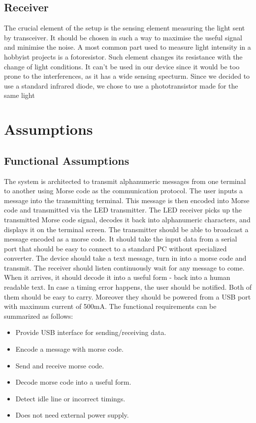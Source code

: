 \documentclass[12pt]{article}
\begin{document}
  \newpage
  \subsection{Receiver}
  The crucial element of the setup is the sensing element measuring the light sent by transceiver.
  It should be chosen in such a way to maximise the useful signal and minimise the noise.
  A most common part used to measure light intensity in a hobbyist projects is a fotoresistor. Such element changes its resistance with the change of light conditions. 
  It can't be used in our device since it would be too prone to the interferences, as it has a wide sensing specturm.
  Since we decided to use a standard infrared diode, we chose to use a phototransistor made for the same light 
	
	\section{Assumptions}
	\subsection{Functional Assumptions}
  The system is architected to transmit alphanumeric messages from one terminal to another using Morse code as the communication protocol. The user inputs a message into the transmitting terminal. This message is then encoded into Morse code and 
  transmitted via the LED transmitter. The LED receiver picks up the transmitted Morse code signal, decodes it back into alphanumeric characters, and displays it on the terminal screen.
  The transmitter should be able to broadcast a message encoded as a morse code. It should take the input data from a serial port that should be easy to connect to a standard PC without specialized converter.
  The device should take a text message, turn in into a morse code and transmit.
  The receiver should listen continuously wait for any message to come. When it arrives, it should decode it into a useful form - back into a human readable text. In case a timing error happens, the user should be notified.
  Both of them should be easy to carry. Moreover they should be powered from a USB port with maximum current of 500mA.
  The functional requirements can be summarized as follows:
  \begin{itemize}
    \item Provide USB interface for sending/receiving data.
    \item Encode a message with morse code.
    \item Send and receive morse code.
    \item Decode morse code into a useful form.
    \item Detect idle line or incorrect timings.
    \item Does not need external power supply.
  \end{itemize}
\end{document}
